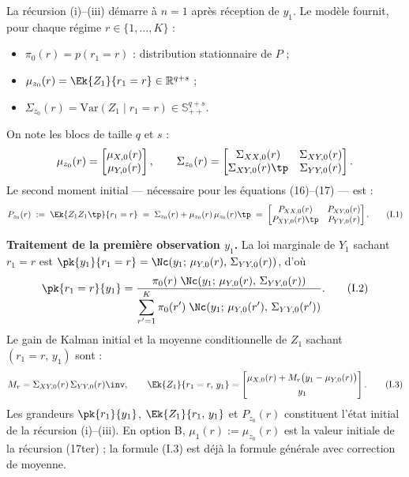 \documentclass[12pt, a4paper]{article}
\begin{document}
\medskip
La récursion (i)--(iii) démarre à $n = 1$ après réception de $y_1$.
Le modèle fournit, pour chaque régime $r \in \{1, \ldots, K\}$ :
\begin{itemize}
  \item[$-$] $\pi_0(r) = p(r_1 = r)$ : distribution stationnaire de $P$ ;
  \item[$-$] $\mu_{z_0}(r) = \Ek{Z_1}{r_1=r} \in \mathbb{R}^{q+s}$ ;
  \item[$-$] $\Sigma_{z_0}(r) = \mathrm{Var}(Z_1 \mid r_1=r) \in \mathbb{S}_{++}^{q+s}$.
\end{itemize}
On note les blocs de taille $q$ et $s$ :
\[
  \mu_{z_0}(r) = \begin{bmatrix}\mu_{X,0}(r)\\\mu_{Y,0}(r)\end{bmatrix}, \qquad
  \Sigma_{z_0}(r) = \begin{bmatrix}\Sigma_{XX,0}(r) & \Sigma_{XY,0}(r) \\
    \Sigma_{XY,0}(r)\tp & \Sigma_{YY,0}(r)\end{bmatrix}.
\]
Le second moment initial --- nécessaire pour les équations (16)--(17) --- est :
\begin{equation}
  P_{z_0}(r) \;:=\; \Ek{Z_1 Z_1\tp}{r_1=r}
  \;=\; \Sigma_{z_0}(r) + \mu_{z_0}(r)\,\mu_{z_0}(r)\tp
  \;=\; \begin{bmatrix}P_{XX,0}(r) & P_{XY,0}(r)\\P_{XY,0}(r)\tp & P_{YY,0}(r)\end{bmatrix}.
  \tag{I.1}
\end{equation}

\noindent\textbf{Traitement de la première observation $y_1$.}
La loi marginale de $Y_1$ sachant $r_1 = r$ est
$\pk{y_1}{r_1=r} = \Nc\!\left(y_1;\,\mu_{Y,0}(r),\,\Sigma_{YY,0}(r)\right)$, d'où
\begin{equation}
  \pk{r_1=r}{y_1} = \frac{\pi_0(r)\;\Nc\!\left(y_1;\,\mu_{Y,0}(r),\,\Sigma_{YY,0}(r)\right)}%
    {\displaystyle\sum_{r'=1}^{K}\pi_0(r')\;\Nc\!\left(y_1;\,\mu_{Y,0}(r'),\,\Sigma_{YY,0}(r')\right)}.
  \tag{I.2}
\end{equation}
Le gain de Kalman initial et la moyenne conditionnelle de $Z_1$ sachant $(r_1=r,\,y_1)$ sont :
\begin{equation}
  M_r = \Sigma_{XY,0}(r)\,\Sigma_{YY,0}(r)\inv, \qquad
  \Ek{Z_1}{r_1=r,\,y_1}
  = \begin{bmatrix}
      \mu_{X,0}(r) + M_r\bigl(y_1 - \mu_{Y,0}(r)\bigr)\\[3pt] y_1
    \end{bmatrix}.
  \tag{I.3}
\end{equation}
Les grandeurs $\pk{r_1}{y_1}$, $\Ek{Z_1}{r_1,\,y_1}$ et $P_{z_0}(r)$ constituent l'état initial
de la récursion (i)--(iii).
{\color{green!60!black}En option B, $\mu_1(r) := \mu_{z_0}(r)$ est la valeur initiale de la récursion (17ter) ;
la formule (I.3) est déjà la formule générale avec correction de moyenne.}
\end{document}
